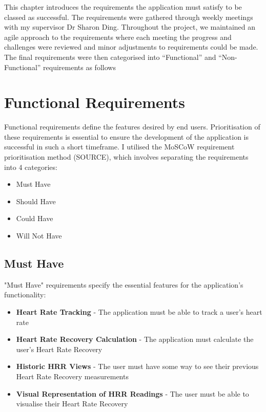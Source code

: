 \documentclass{l4proj}
\begin{document}
This chapter introduces the requirements the application must satisfy to  be classed as successful. The requirements were gathered through weekly meetings with my supervisor Dr Sharon Ding. Throughout the project, we maintained an agile approach to the requirements where each meeting the progress and challenges were reviewed and minor adjustments to requirements could be made. The final requirements were then categorised into “Functional” and “Non-Functional” requirements as follows

\section{Functional Requirements}

Functional requirements define the features desired by end users. Prioritisation of these requirements is essential to ensure the development of the application is successful in such a short timeframe. I utilised the MoSCoW requirement prioritisation method (SOURCE), which involves separating the requirements into 4 categories:

\begin{itemize}
    \item Must Have 
    \item Should Have
    \item Could Have
    \item Will Not Have
\end{itemize}

\subsection{Must Have}

"Must Have" requirements specify the essential features for the application's functionality:

\begin{itemize}
    \item \textbf{Heart Rate Tracking} - The application must be able to track a user's heart rate
    \item \textbf{Heart Rate Recovery Calculation} - The application must calculate the user's Heart Rate Recovery
    \item \textbf{Historic HRR Views} - The user must have some way to see their previous Heart Rate Recovery measurements
    \item \textbf{Visual Representation of HRR Readings} - The user must be able to visualise their Heart Rate Recovery
\end{itemize}
\end{document}
